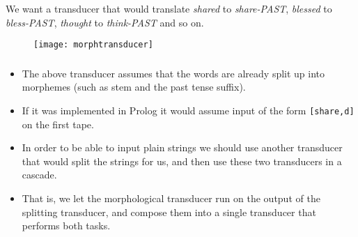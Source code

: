\begin{frame}

	\frametitle{\insertsection}
	\framesubtitle{\insertsubsection}
	
	We want a transducer that would translate \textit{shared} to \textit{share-PAST}, \textit{blessed} to \textit{bless-PAST}, \textit{thought} to \textit{think-PAST} and so on.
	
	\begin{figure}
		\texttt{[image: morphtransducer]}
	\end{figure}

\end{frame}




\begin{frame}

	\frametitle{\insertsection}
	\framesubtitle{\insertsubsection}
	
	\begin{itemize}
		\item The above transducer assumes that the words are already split up into morphemes (such as stem and the past tense suffix).
		\item If it was implemented in Prolog it would assume input of the form \texttt{[share,d]} on the first tape.
		\item In order to be able to input plain strings we should use another transducer that would split the strings for us, and then use these two transducers in a cascade.
		\item That is, we let the morphological transducer run on the output of the splitting transducer, and compose them into a single transducer that performs both tasks.
	\end{itemize}
	
\end{frame}


